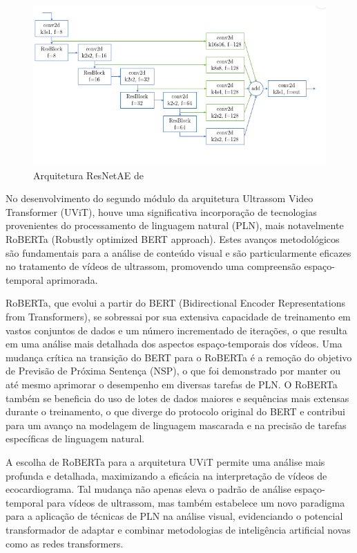 \begin{figure}
    \centering
    \includegraphics[width=1\linewidth]{image.png}
   \caption{Arquitetura ResNetAE de \textcite{ResNetAE} }
    \label{fig:resnetAE}
\end{figure}

No desenvolvimento do segundo módulo da arquitetura Ultrassom Video Transformer (UViT), houve uma significativa incorporação de tecnologias provenientes do processamento de linguagem natural (PLN), mais notavelmente RoBERTa (Robustly optimized BERT approach). Estes avanços metodológicos são fundamentais para a análise de conteúdo visual e são particularmente eficazes no tratamento de vídeos de ultrassom, promovendo uma compreensão espaço-temporal aprimorada.

RoBERTa, que evolui a partir do BERT (Bidirectional Encoder Representations from Transformers), se sobressai por sua extensiva capacidade de treinamento em vastos conjuntos de dados e um número incrementado de iterações, o que resulta em uma análise mais detalhada dos aspectos espaço-temporais dos vídeos. Uma mudança crítica na transição do BERT para o RoBERTa é a remoção do objetivo de Previsão de Próxima Sentença (NSP), o que foi demonstrado por \textcite{Roberta} manter ou até mesmo aprimorar o desempenho em diversas tarefas de PLN. O RoBERTa também se beneficia do uso de lotes de dados maiores e sequências mais extensas durante o treinamento, o que diverge do protocolo original do BERT e contribui para um avanço na modelagem de linguagem mascarada e na precisão de tarefas específicas de linguagem natural.

A escolha de RoBERTa para a arquitetura UViT permite uma análise mais profunda e detalhada, maximizando a eficácia na interpretação de vídeos de ecocardiograma. Tal mudança não apenas eleva o padrão de análise espaço-temporal para vídeos de ultrassom, mas também estabelece um novo paradigma para a aplicação de técnicas de PLN na análise visual, evidenciando o potencial transformador de adaptar e combinar metodologias de inteligência artificial novas como as redes transformers.

